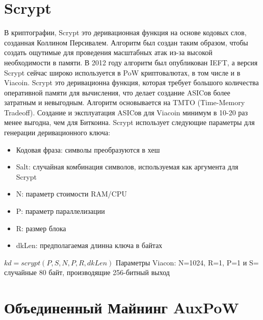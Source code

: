 \documentclass{article}
\begin{document}
\section{Scrypt}\label{sec: Scrypt}
В криптографии, \cite{scrypt} Scrypt это деривационная функция на основе кодовых слов,
созданная Коллином Персивалем. Алгоритм был создан таким образом, чтобы
создать ощутимые для проведения масштабных атак из-за высокой необходимости в
памяти. В 2012 году алгоритм был опубликован IEFT, а версия Scrypt сейчас широко
используется в PoW криптовалютах, в том числе и в Viacoin.
\newline \newline \noindent
Scrypt это деривационна функция, которая требует большого количества оперативной
памяти для вычисления, что делает создание ASICов более затратным и невыгодным.
Алгоритм основывается на TMTO (Time-Memory Tradeoff). Создание и эксплуатация
ASICов для Viacoin минимум в 10-20 раз менее выгодна, чем для Биткоина.
\newline \newline \noindent
Scrypt использует следующие параметры для генерации деривационного ключа:
\begin{itemize}
\item Кодовая фраза: символы преобразуются в хеш
\item Salt: случайная комбинация символов, используемая как аргумента для Scrypt
\item N: параметр стоимости RAM/CPU
\item P: параметр параллелизации
\item R: размер блока
\item dkLen: предполагаемая длинна ключа в байтах
\end{itemize}
$kd = scrypt(P, S, N, P, R, dkLen)$
\newline \newline \noindent
Параметры Viacon: N=1024, R=1, P=1 и S= случайные 80 байт, производящие 256-битный выход

\section{Объединенный Майнинг AuxPoW}\label{sec:Merged Mining AuxPoW}
\end{document}
